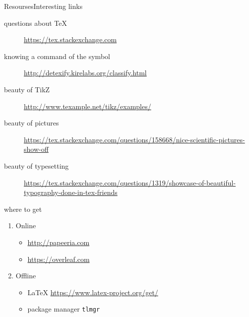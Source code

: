 
\begin{frame}[fragile]{Resourses}{Interesting links}
\cprotect{}
\small
\begin{description}
    \item[questions about \TeX] \url{https://tex.stackexchange.com} \vspace{-1ex}
    \item[knowing a command of the symbol] \url{http://detexify.kirelabs.org/classify.html} \vspace{-1ex}
    \item[beauty of TikZ] \url{http://www.texample.net/tikz/examples/} \vspace{-1ex}
    \item[beauty of pictures] \url{https://tex.stackexchange.com/questions/158668/nice-scientific-pictures-show-off}\vspace{-1ex}
    \item[beauty of typesetting] \url{https://tex.stackexchange.com/questions/1319/showcase-of-beautiful-typography-done-in-tex-friends}\vspace{-1ex}
\end{description}
\end{frame}

\begin{frame}[fragile]{where to get}
\begin{enumerate}
    \item Online
    \begin{itemize}
        \item \url{http://papeeria.com}
        \item \url{https://overleaf.com}
    \end{itemize}
    \item Offline
    \begin{itemize}
        \item \LaTeX{} \url{https://www.latex-project.org/get/}
        \item package manager \verb'tlmgr'
    \end{itemize}
\end{enumerate}
     
\end{frame}